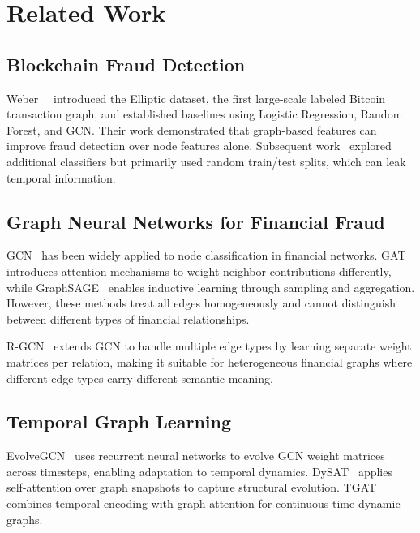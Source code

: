 \section{Related Work}

\subsection{Blockchain Fraud Detection}

Weber~\etal~\cite{weber2019anti} introduced the Elliptic dataset, the first large-scale labeled Bitcoin transaction graph, and established baselines using Logistic Regression, Random Forest, and GCN. Their work demonstrated that graph-based features can improve fraud detection over node features alone. Subsequent work~\cite{alarab2020comparative} explored additional classifiers but primarily used random train/test splits, which can leak temporal information.

\subsection{Graph Neural Networks for Financial Fraud}

GCN~\cite{kipf2017semi} has been widely applied to node classification in financial networks. GAT~\cite{velickovic2018graph} introduces attention mechanisms to weight neighbor contributions differently, while GraphSAGE~\cite{hamilton2017inductive} enables inductive learning through sampling and aggregation. However, these methods treat all edges homogeneously and cannot distinguish between different types of financial relationships.

R-GCN~\cite{schlichtkrull2018modeling} extends GCN to handle multiple edge types by learning separate weight matrices per relation, making it suitable for heterogeneous financial graphs where different edge types carry different semantic meaning.

\subsection{Temporal Graph Learning}

EvolveGCN~\cite{pareja2020evolvegcn} uses recurrent neural networks to evolve GCN weight matrices across timesteps, enabling adaptation to temporal dynamics. DySAT~\cite{sankar2020dysat} applies self-attention over graph snapshots to capture structural evolution. TGAT~\cite{xu2020inductive} combines temporal encoding with graph attention for continuous-time dynamic graphs.


